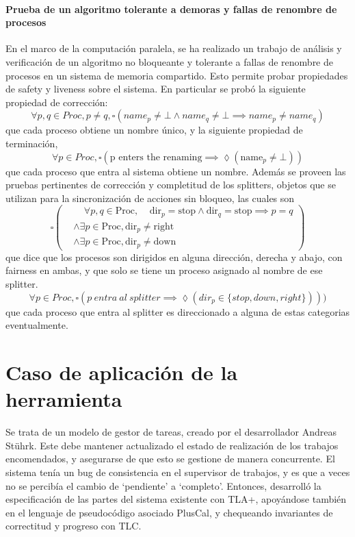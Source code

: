 \documentclass[runningheads]{llncs}
\begin{document}
\paragraph{Prueba de un algoritmo tolerante a demoras y fallas de renombre de procesos}
En el marco de la computación paralela, se ha realizado un trabajo de análisis y verificación de un algoritmo no bloqueante y tolerante a fallas de renombre de procesos en un sistema de memoria compartido. Esto permite probar propiedades de safety y liveness sobre el sistema. En particular se probó la siguiente propiedad de corrección:
%
\begin{equation}
    \forall p, q \in Proc, p \neq q, \square(name_p \neq \bot \land name_q \neq \bot \implies name_p \neq name_q)
\end{equation}
%
que cada proceso obtiene un nombre único, y la siguiente propiedad de terminación,
%
\begin{equation}
    \forall p \in Proc, \square(\text{p enters the renaming} \implies \lozenge (\text{name}_p \neq \bot))
\end{equation}
%
que cada proceso que entra al sistema obtiene un nombre.
Además se proveen las pruebas pertinentes de corrección y completitud de los splitters, objetos que se utilizan para la sincronización de acciones sin bloqueo,  las cuales son
%
\[
\square \left( \begin{aligned}
    &\phantom{\land} \forall p,q \in \text{Proc}, \phantom{\land} \text{dir}_p = \text{stop} \land \text{dir}_q = \text{stop} \implies p = q \\
    &\land \exists p \in \text{Proc}, \text{dir}_p \neq \text{right} \\
    &\land \exists p \in \text{Proc}, \text{dir}_p \neq \text{down}
\end{aligned} \right)
\]
%
que dice que los procesos son dirigidos en alguna dirección, derecha y abajo, con fairness en ambas, y que solo se tiene un proceso asignado al nombre de ese splitter.
%
\[
    \forall p \in Proc, \square(p\ entra\ al\ splitter \implies \lozenge(dir_p \in \{stop, down, right\})))    
\]
%
que cada proceso que entra al splitter es direccionado a alguna de estas categorias eventualmente.

\section{Caso de aplicación de la herramienta}
Se trata de un modelo de gestor de tareas, creado por el desarrollador Andreas Stührk. Este debe mantener actualizado el estado de realización de los trabajos encomendados, y asegurarse de que esto se gestione de manera concurrente. El sistema tenía un bug de consistencia en el supervisor de trabajos, y es que a veces no se percibía el cambio de ‘pendiente’ a ‘completo’. Entonces, desarrolló la especificación de las partes del sistema existente con TLA+, apoyándose también en el lenguaje de pseudocódigo asociado PlusCal, y chequeando invariantes de correctitud y progreso con TLC.
\end{document}
